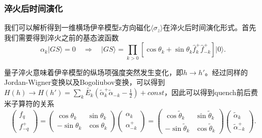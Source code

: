 \documentclass[12pt]{article}
\begin{document}
   
      

       \subsubsection{淬火后时间演化}
      
      我们可以解析得到一维横场伊辛模型z方向磁化$\langle\sigma_z\rangle$在淬火后时间演化形式。首先我们需要得到淬火之前的基态波函数
      \begin{equation}\alpha_k|GS\rangle =0 \quad \Rightarrow \quad |GS\rangle=\prod_{k>0}[\cos\theta_k+\sin\theta_k\hat{f}_k^+\hat{f}_{-k}^+]|0\rangle .\end{equation}
      
      量子淬火意味着伊辛模型的纵场项强度突然发生变化，即$h\to h'$。经过同样的Jordan-Wigner变换以及Bogoliubov变换，可以得到$H(h)\to H(h')=\sum_{k}\tilde{E_k}(\tilde{\alpha}_k^+\tilde{\alpha}_{-k}-\frac{1}{2})+const$，因此可以得到quench前后费米子算符的关系
      \begin{equation} \begin{pmatrix} f_q\\f^+_{-q} \end{pmatrix}=\begin{pmatrix} \cos\theta_k & \sin\theta_k\\ -\sin\theta_k& \cos\theta_k \end{pmatrix}
      \begin{pmatrix} \alpha_k\\\alpha_{-k}^+ \end{pmatrix} = \begin{pmatrix} \cos\tilde\theta_k & \sin\tilde\theta_k\\ -\sin\tilde\theta_k& \cos\tilde\theta_k \end{pmatrix} \begin{pmatrix} \tilde\alpha_k\\\tilde\alpha_{-k}^+ \end{pmatrix} .\end{equation}
      
\end{document}
